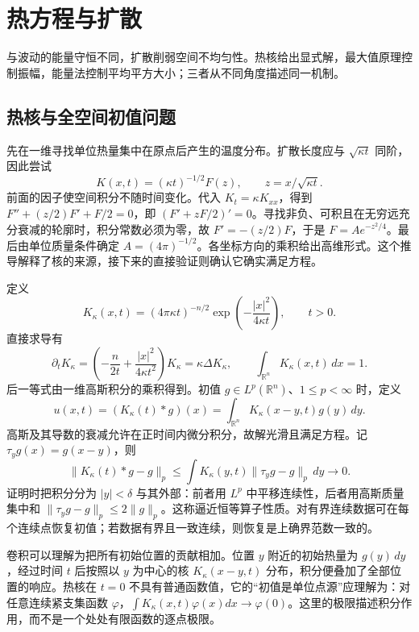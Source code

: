 \documentclass[UTF8,12pt,a4paper,fontset=fandol]{ctexbook}
\begin{document}
\chapter{热方程与扩散}
\label{chap:heat}

与波动的能量守恒不同，扩散削弱空间不均匀性。热核给出显式解，最大值原理控制振幅，能量法控制平均平方大小；三者从不同角度描述同一机制。

\section{热核与全空间初值问题}
先在一维寻找单位热量集中在原点后产生的温度分布。扩散长度应与 $\sqrt{\kappa t}$ 同阶，因此尝试
\[
 K(x,t)=(\kappa t)^{-1/2}F(z),\qquad z=x/\sqrt{\kappa t}.
\]
前面的因子使空间积分不随时间变化。代入 $K_t=\kappa K_{xx}$，得到 $F''+(z/2)F'+F/2=0$，即 $(F'+zF/2)'=0$。寻找非负、可积且在无穷远充分衰减的轮廓时，积分常数必须为零，故 $F'=-(z/2)F$，于是 $F=Ae^{-z^2/4}$。最后由单位质量条件确定 $A=(4\pi)^{-1/2}$。各坐标方向的乘积给出高维形式。这个推导解释了核的来源，接下来的直接验证则确认它确实满足方程。

定义
\begin{equation}
 K_\kappa(x,t)=(4\pi\kappa t)^{-n/2}\exp\left(-\frac{|x|^2}{4\kappa t}\right),\qquad t>0.
 \label{eq:heat-kernel}
\end{equation}
直接求导有
\[
 \partial_tK_\kappa=\left(-\frac n{2t}+\frac{|x|^2}{4\kappa t^2}\right)K_\kappa
 =\kappa\Delta K_\kappa,
 \qquad \int_{\mathbb R^n}K_\kappa(x,t)\,dx=1.
\]
后一等式由一维高斯积分的乘积得到。初值 $g\in L^p(\mathbb R^n)$、$1\le p<\infty$ 时，定义
\begin{equation}
 u(x,t)=(K_\kappa(t)*g)(x)=\int_{\mathbb R^n}K_\kappa(x-y,t)g(y)\,dy.
 \label{eq:heat-convolution}
\end{equation}
高斯及其导数的衰减允许在正时间内微分积分，故解光滑且满足方程。记 $\tau_y g(x)=g(x-y)$，则
\[
 \|K_\kappa(t)*g-g\|_p
 \le\int K_\kappa(y,t)\|\tau_y g-g\|_p\,dy\longrightarrow0.
\]
证明时把积分分为 $|y|<\delta$ 与其外部：前者用 $L^p$ 中平移连续性，后者用高斯质量集中和 $\|\tau_yg-g\|_p\le2\|g\|_p$。这称逼近恒等算子性质。对有界连续数据可在每个连续点恢复初值；若数据有界且一致连续，则恢复是上确界范数一致的。

卷积可以理解为把所有初始位置的贡献相加。位置 $y$ 附近的初始热量为 $g(y)\,dy$，经过时间 $t$ 后按照以 $y$ 为中心的核 $K_\kappa(x-y,t)$ 分布，积分便叠加了全部位置的响应。热核在 $t=0$ 不具有普通函数值，它的“初值是单位点源”应理解为：对任意连续紧支集函数 $\varphi$，$\int K_\kappa(x,t)\varphi(x)dx\to\varphi(0)$。这里的极限描述积分作用，而不是一个处处有限函数的逐点极限。
\end{document}
